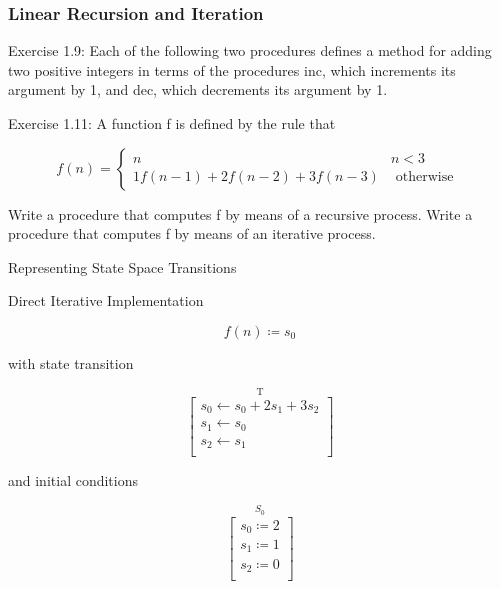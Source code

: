             \subsubsection{Linear Recursion and Iteration}
Exercise 1.9: Each of the following two procedures defines a method for adding two positive integers in terms of the procedures inc, which increments its argument by 1, and dec, which decrements its argument by 1.
\newline

Exercise 1.11: A function f is defined by the rule that 

\begin{equation}
f\left(n\right) = 
\begin{cases}
n & n < 3 \\
1 f\left(n-1\right) + 2 f\left(n-2\right) + 3 f\left(n-3\right) & \mbox{ otherwise }
\end{cases}
\label{eq:ss_recursive}
\end{equation}

Write a procedure that computes f by means of a recursive process. Write a procedure that computes f by means of an iterative process.
\newline

Representing State Space Transitions
\newline

Direct Iterative Implementation
\newline

\begin{equation}
f\left(n\right) \coloneqq s_0
\label{eq:direct_def}
\end{equation}

with state transition

\begin{equation}
\stackrel{\mbox{T}}{
\left[ \begin{array}{c}
s_0 \leftarrow s_0 + 2 s_1 + 3 s_2 \\
s_1 \leftarrow s_0 \\
s_2 \leftarrow s_1 \\
\end{array} \right]
}
\label{eq:direct_trans}
\end{equation}

and initial conditions

\begin{equation}
\stackrel{\mbox{$S_0$}}{
\left[ \begin{array}{c}
s_0 \coloneqq 2 \\
s_1 \coloneqq 1 \\
s_2 \coloneqq 0 \\
\end{array} \right]
}
\label{eq:direct_init}
\end{equation}

